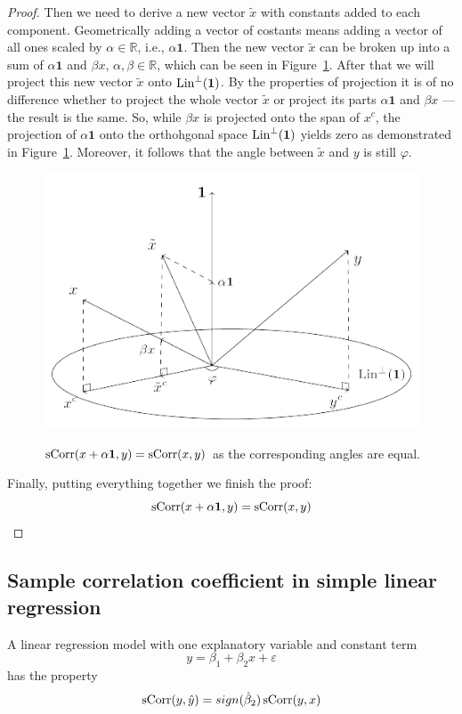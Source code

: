 \begin{proof}
Then we need to derive a new vector $\tilde x$ with constants added to each component.
Geometrically adding a vector of costants means adding a vector of all ones
scaled by $\alpha \in \mathbb{R}$, i.e., $\alpha \mathbf{1}$.
Then the new vector $\tilde x$ can be broken up into a sum of $\alpha \mathbf{1}$ and
$\beta x$, $\alpha, \beta \in \mathbb{R}$, which can be seen in Figure~\ref{fig:corr_final}.
After that we will project this new vector $\tilde x$ onto $\operatorname{Lin}^{\perp}(\mathbf{1})$.
By the properties of projection it is of no difference whether to project
the whole vector $\tilde x$ or project its parts $\alpha \mathbf{1}$
and $\beta x$ — the result is the same.
So, while $\beta x$ is projected onto the span of $x^c$, the projection of $\alpha \mathbf{1}$
onto the orthohgonal space $\operatorname{Lin}^{\perp}(\mathbf{1})$ yields zero as demonstrated
in Figure~\ref{fig:corr_final}.
Moreover, it follows that the angle between $\tilde x$ and $y$ is still $\varphi$.

\begin{figure}
\begin{center}
\includegraphics[width=0.6\linewidth]{figures/02_correlation_constant_proof.pdf}
\label{fig:corr_final}
\caption{$\operatorname{sCorr}(x + \alpha \mathbf{1}, y) = \operatorname{sCorr}(x,y)$ as the corresponding angles are equal.}
\end{center}
\end{figure}


Finally, putting everything together we finish the proof:
\[
\operatorname{sCorr}(x + \alpha \mathbf{1}, y) = \operatorname{sCorr}(x,y)
\]
\end{proof}


\subsection{Sample correlation coefficient in simple linear regression}

\begin{theorem}
A linear regression model with one explanatory variable and constant term
\[
y = \beta_1 + \beta_2 x + \varepsilon
\]
has the property
\[
\operatorname{sCorr}(y, \hat y) = sign(\hat \beta_2) \operatorname{sCorr}(y, x)
\]
\end{theorem}

